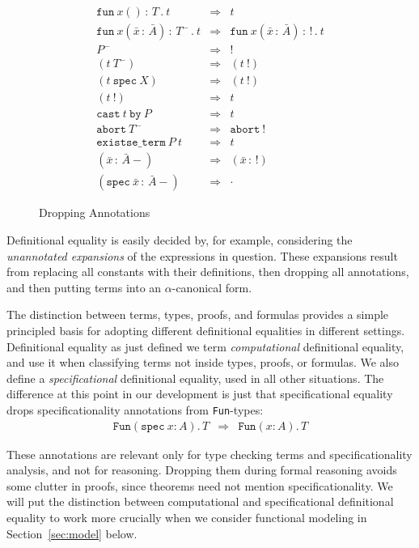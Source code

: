 \documentclass[preprint,natbib]{sigplanconf}
\newcommand{\bang}[0]{\texttt{!}}
\newcommand{\To}{\Rightarrow}
\begin{document}
\begin{figure}
\[
\begin{array}{lll} 
\texttt{fun}\ x()\, :\, T\, .\ t & \To & t \\
\texttt{fun}\ x(\bar{x}\,:\,\bar{A})\, :\, T^-\, .\ t & \To &
\texttt{fun}\ x(\bar{x}\,:\,\bar{A})\, :\, \bang\, .\ t \\
P^- & \To & \bang \\
(t\ T^-) & \To & (t\ \bang) \\
(t\ \texttt{spec}\ X) & \To & (t\ \bang) \\
(t\ \bang) & \To & t \\
\texttt{cast}\ t\ \texttt{by}\ P & \To & t \\
\texttt{abort}\ T^- & \To & \texttt{abort}\ \bang \\
\texttt{existse\_term}\ P\ t & \To & t \\
(\bar{x}\,:\,\bar{A}-) & \To & (\bar{x}\,:\,\bang) \\
(\texttt{spec}\ \bar{x}\,:\,\bar{A}-) & \To & \cdot
\end{array}
\]
\caption{\label{fig:dropannos}Dropping Annotations}
\end{figure}

Definitional equality is easily decided by, for example, considering
the \emph{unannotated expansions} of the expressions in question.
These expansions result from replacing all constants with their
definitions, then dropping all annotations, and then putting terms
into an $\alpha$-canonical form.

The distinction between terms, types, proofs, and formulas provides a
simple principled basis for adopting different definitional equalities
in different settings.  Definitional equality as just defined we term
\emph{computational} definitional equality, and use it when
classifying terms not inside types, proofs, or formulas.  We also
define a \emph{specificational} definitional equality, used in all
other situations.  The difference at this point in our development is
just that specificational equality drops specificationality
annotations from \texttt{Fun}-types:
\[
\begin{array}{lll} 
\texttt{Fun}(\texttt{spec}\ x:A).\,T & \To & 
\texttt{Fun}(x:A).\,T 
\end{array}
\]

\noindent These annotations are relevant only for type checking terms
and specificationality analysis, and not for reasoning.  Dropping them
during formal reasoning avoids some clutter in proofs, since theorems
need not mention specificationality.  We will put the distinction
between computational and specificational definitional equality to
work more crucially when we consider functional modeling in
Section~\ref{sec:model} below.
\end{document}
